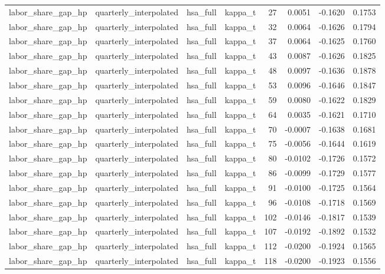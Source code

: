 \begin{tabular}{llllrrrr}
labor\_share\_gap\_hp & quarterly\_interpolated & hsa\_full & kappa\_t & 27 & 0.0051 & -0.1620 & 0.1753 \\
labor\_share\_gap\_hp & quarterly\_interpolated & hsa\_full & kappa\_t & 32 & 0.0064 & -0.1626 & 0.1794 \\
labor\_share\_gap\_hp & quarterly\_interpolated & hsa\_full & kappa\_t & 37 & 0.0064 & -0.1625 & 0.1760 \\
labor\_share\_gap\_hp & quarterly\_interpolated & hsa\_full & kappa\_t & 43 & 0.0087 & -0.1626 & 0.1825 \\
labor\_share\_gap\_hp & quarterly\_interpolated & hsa\_full & kappa\_t & 48 & 0.0097 & -0.1636 & 0.1878 \\
labor\_share\_gap\_hp & quarterly\_interpolated & hsa\_full & kappa\_t & 53 & 0.0096 & -0.1646 & 0.1847 \\
labor\_share\_gap\_hp & quarterly\_interpolated & hsa\_full & kappa\_t & 59 & 0.0080 & -0.1622 & 0.1829 \\
labor\_share\_gap\_hp & quarterly\_interpolated & hsa\_full & kappa\_t & 64 & 0.0035 & -0.1621 & 0.1710 \\
labor\_share\_gap\_hp & quarterly\_interpolated & hsa\_full & kappa\_t & 70 & -0.0007 & -0.1638 & 0.1681 \\
labor\_share\_gap\_hp & quarterly\_interpolated & hsa\_full & kappa\_t & 75 & -0.0056 & -0.1644 & 0.1619 \\
labor\_share\_gap\_hp & quarterly\_interpolated & hsa\_full & kappa\_t & 80 & -0.0102 & -0.1726 & 0.1572 \\
labor\_share\_gap\_hp & quarterly\_interpolated & hsa\_full & kappa\_t & 86 & -0.0099 & -0.1729 & 0.1577 \\
labor\_share\_gap\_hp & quarterly\_interpolated & hsa\_full & kappa\_t & 91 & -0.0100 & -0.1725 & 0.1564 \\
labor\_share\_gap\_hp & quarterly\_interpolated & hsa\_full & kappa\_t & 96 & -0.0108 & -0.1718 & 0.1569 \\
labor\_share\_gap\_hp & quarterly\_interpolated & hsa\_full & kappa\_t & 102 & -0.0146 & -0.1817 & 0.1539 \\
labor\_share\_gap\_hp & quarterly\_interpolated & hsa\_full & kappa\_t & 107 & -0.0192 & -0.1892 & 0.1532 \\
labor\_share\_gap\_hp & quarterly\_interpolated & hsa\_full & kappa\_t & 112 & -0.0200 & -0.1924 & 0.1565 \\
labor\_share\_gap\_hp & quarterly\_interpolated & hsa\_full & kappa\_t & 118 & -0.0200 & -0.1923 & 0.1556 \\

\end{tabular}
